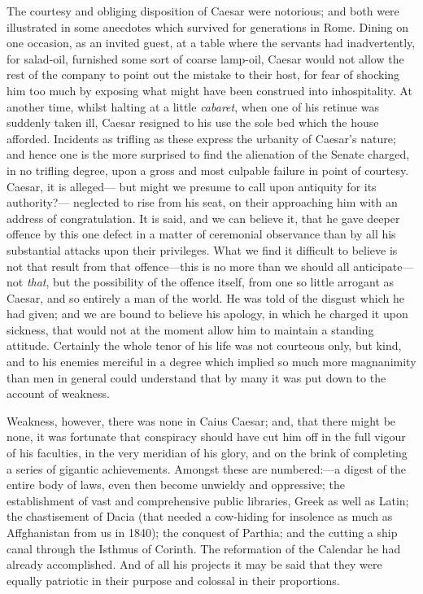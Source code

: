The courtesy and obliging disposition of Caesar were notorious; and both
were illustrated in some anecdotes which survived for generations in
Rome. Dining on one occasion, as an invited guest, at a table where the
servants had inadvertently, for salad-oil, furnished some sort of coarse
lamp-oil, Caesar would not allow the rest of the company to point out
the mistake to their host, for fear of shocking him too much by exposing
what might have been construed into inhospitality. At another time,
whilst halting at a little \emph{cabaret}, when one of his retinue was
suddenly taken ill, Caesar resigned to his use the sole bed which the
house afforded. Incidents as trifling as these express the urbanity of
Caesar's nature; and hence one is the more surprised to find the
alienation of the Senate charged, in no trifling degree, upon a gross
and most culpable failure in point of courtesy. Caesar, it is alleged—
but might we presume to call upon antiquity for its authority?—
neglected to rise from his seat, on their approaching him with an
address of congratulation. It is said, and we can believe it, that he
gave deeper offence by this one defect in a matter of ceremonial
observance than by all his substantial attacks upon their privileges.
What we find it difficult to believe is not that result from that
offence—this is no more than we should all anticipate—not \emph{that}, but
the possibility of the offence itself, from one so little arrogant as
Caesar, and so entirely a man of the world. He was told of the disgust
which he had given; and we are bound to believe his apology, in which he
charged it upon sickness, that would not at the moment allow him to
maintain a standing attitude. Certainly the whole tenor of his life was
not courteous only, but kind, and to his enemies merciful in a degree
which implied so much more magnanimity than men in general could
understand that by many it was put down to the account of weakness.

Weakness, however, there was none in Caius Caesar; and, that there might
be none, it was fortunate that conspiracy should have cut him off in the
full vigour of his faculties, in the very meridian of his glory, and on
the brink of completing a series of gigantic achievements. Amongst these
are numbered:—a digest of the entire body of laws, even then become
unwieldy and oppressive; the establishment of vast and comprehensive
public libraries, Greek as well as Latin; the chastisement of Dacia
(that needed a cow-hiding for insolence as much as Affghanistan from us
in 1840); the conquest of Parthia; and the cutting a ship canal through
the Isthmus of Corinth. The reformation of the Calendar he had already
accomplished. And of all his projects it may be said that they were
equally patriotic in their purpose and colossal in their proportions.

